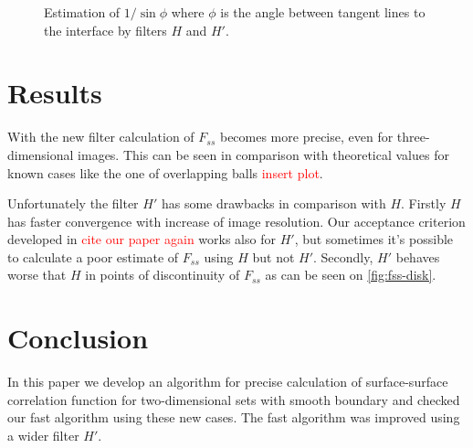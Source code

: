 \documentclass[reprint,amsmath,amssymb,aps,pre,showkeys,showpacs]{revtex4-1}
\begin{document}
\begin{figure}[!pt]
  \centering
  \hfill
  \caption[]{Estimation of $1/\sin\phi$ where $\phi$ is the angle between
    tangent lines to the interface by filters $H$ and $H'$.}
  \label{fig:angles}
\end{figure}

\section{Results}
With the new filter calculation of $F_{ss}$ becomes more precise, even for
three-dimensional images. This can be seen in comparison with theoretical values
for known cases like the one of overlapping balls \textcolor{red}{insert plot}.

Unfortunately the filter $H'$ has some drawbacks in comparison with $H$. Firstly
$H$ has faster convergence with increase of image resolution. Our
acceptance criterion developed in \textcolor{red}{cite our paper again} works
also for $H'$, but sometimes it's possible to calculate a poor estimate of
$F_{ss}$ using $H$ but not $H'$. Secondly, $H'$ behaves worse that $H$ in points
of discontinuity of $F_{ss}$ as can be seen on \cref{fig:fss-disk}.

\section{Conclusion}
In this paper we develop an algorithm for precise calculation of surface-surface
correlation function for two-dimensional sets with smooth boundary and checked
our fast algorithm using these new cases. The fast algorithm was improved using
a wider filter $H'$.
\end{document}
